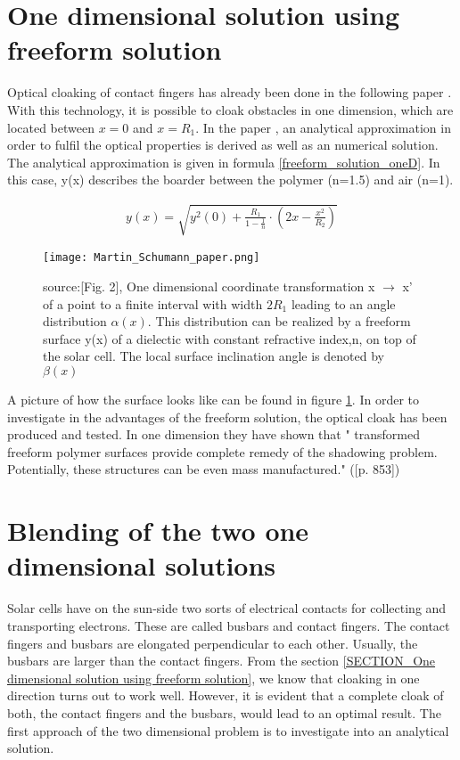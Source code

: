 \section{One dimensional solution using freeform solution \label{SECTION_One dimensional solution using freeform solution}}
Optical cloaking of contact fingers has already been done in the following paper \cite{schumann2015cloaked}. With this technology, it is possible to cloak obstacles in one dimension, which are located between $x=0$ and $x=R_1$. In the paper \cite{schumann2015cloaked}, an analytical approximation in order to fulfil the optical properties is derived as well as an numerical solution. The analytical approximation is given in formula \ref{freeform_solution_oneD}. In this case, y(x) describes the boarder between the polymer (n=1.5) and air (n=1). 

\begin{align}
y(x)= \sqrt{y^2(0)+\frac{R_1}{1-\frac{1}{n}} \cdot \left(2x -\frac{x^2}{R_2} \right)} \label{freeform_solution_oneD}
\end{align}
\begin{figure}[h]
\centering
\texttt{[image: Martin\_Schumann\_paper.png]}
\caption{source:\cite{schumann2015cloaked}[Fig. 2], One dimensional coordinate transformation x $\rightarrow$ x' of a point to a finite interval with width $2R_1$ leading to an angle distribution $\alpha (x)$. This distribution can be realized by a freeform surface y(x) of a dielectic with constant refractive index,n, on top of the solar cell. The local surface inclination angle is denoted by $\beta (x)$ \label{Martin_schumann_paper}}
\end{figure}

A picture of how the surface looks like can be found in figure \ref{Martin_schumann_paper}. In order to investigate in the advantages of the freeform solution, the optical cloak has been produced and tested. In one dimension they have shown that " transformed freeform polymer surfaces provide complete remedy of the shadowing problem. Potentially, these structures can be even mass manufactured." (\cite{schumann2015cloaked}[p. 853])

\section{Blending of the two one dimensional solutions}

Solar cells have on the sun-side two sorts of electrical contacts for collecting and transporting electrons. These are called busbars and contact fingers. The contact fingers and busbars are elongated perpendicular to each other. Usually, the busbars are larger than the contact fingers. 
From the section \ref{SECTION_One dimensional solution using freeform solution}, we know that cloaking in one direction turns out to work well. However, it is evident that a complete cloak of both, the contact fingers and the busbars, would lead to an optimal result. 
The first approach of the two dimensional problem is to investigate into an analytical solution. 

